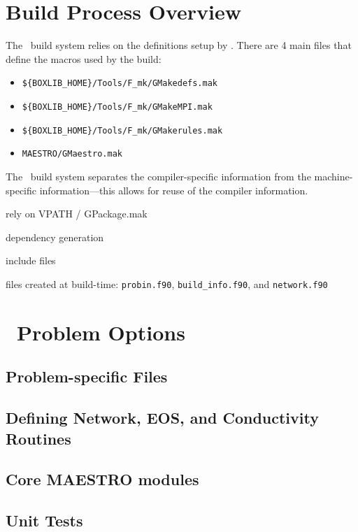 \label{ch:make}

\section{Build Process Overview}

The \maestro\ build system relies on the definitions setup by \boxlib.  There are
4 main files that define the macros used by the build:
\begin{itemize}
\item {\tt \$\{BOXLIB\_HOME\}/Tools/F\_mk/GMakedefs.mak}

\item {\tt \$\{BOXLIB\_HOME\}/Tools/F\_mk/GMakeMPI.mak}

\item {\tt \$\{BOXLIB\_HOME\}/Tools/F\_mk/GMakerules.mak}

\item {\tt MAESTRO/GMaestro.mak}
\end{itemize}

The \boxlib\ build system separates the compiler-specific information
from the machine-specific information---this allows for reuse of the
compiler information.

rely on VPATH  / GPackage.mak

dependency generation

include files

files created at build-time: {\tt probin.f90}, {\tt build\_info.f90}, and {\tt network.f90}


\section{\maestro\ Problem Options}

\subsection{Problem-specific Files}

\subsection{Defining Network, EOS, and Conductivity Routines}

\subsection{Core MAESTRO modules}

\subsection{Unit Tests}


